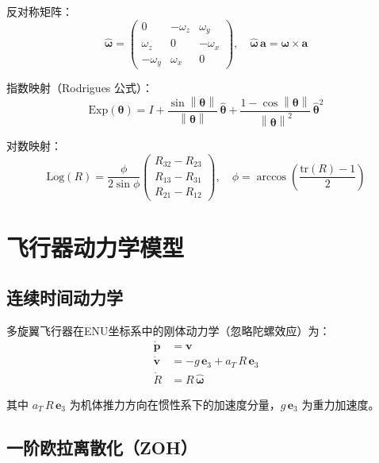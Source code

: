 \documentclass[UTF8, a4paper, 11pt]{ctexart}
\newcommand{\R}{\mathbb{R}}
\newcommand{\bp}{\mathbf{p}}
\newcommand{\bv}{\mathbf{v}}
\newcommand{\bw}{\boldsymbol{\omega}}
\newcommand{\Log}{\mathrm{Log}}
\newcommand{\Exp}{\mathrm{Exp}}
\newcommand{\hhat}[1]{\widehat{#1}}
\newcommand{\norm}[1]{\left\|#1\right\|}
\begin{document}
反对称矩阵：
\begin{equation}
  \hhat{\bw} = \begin{pmatrix}0 & -\omega_z & \omega_y \\ \omega_z & 0 & -\omega_x \\ -\omega_y & \omega_x & 0\end{pmatrix}, \quad \hhat{\bw}\,\mathbf{a} = \bw \times \mathbf{a}
\end{equation}

指数映射（Rodrigues 公式）：
\begin{equation}
  \Exp(\boldsymbol{\theta}) = I + \frac{\sin\norm{\boldsymbol{\theta}}}{\norm{\boldsymbol{\theta}}}\,\hhat{\boldsymbol{\theta}} + \frac{1-\cos\norm{\boldsymbol{\theta}}}{\norm{\boldsymbol{\theta}}^2}\,\hhat{\boldsymbol{\theta}}^2
\end{equation}

对数映射：
\begin{equation}
  \Log(R) = \frac{\phi}{2\sin\phi}\begin{pmatrix}R_{32}-R_{23}\\R_{13}-R_{31}\\R_{21}-R_{12}\end{pmatrix}, \quad \phi = \arccos\!\left(\frac{\mathrm{tr}(R)-1}{2}\right)
\end{equation}

\section{飞行器动力学模型}

\subsection{连续时间动力学}

多旋翼飞行器在ENU坐标系中的刚体动力学（忽略陀螺效应）为：
\begin{align}
  \dot{\bp} &= \bv \label{eq:dyn_p}\\
  \dot{\bv} &= -g\,\mathbf{e}_3 + a_T\,R\,\mathbf{e}_3 \label{eq:dyn_v}\\
  \dot{R}   &= R\,\hhat{\bw} \label{eq:dyn_R}
\end{align}

其中 $a_T\,R\,\mathbf{e}_3$ 为机体推力方向在惯性系下的加速度分量，$g\,\mathbf{e}_3$ 为重力加速度。

\subsection{一阶欧拉离散化（ZOH）}
\end{document}

